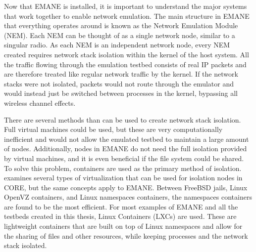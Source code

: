 Now that EMANE is installed, it is important to understand the major systems that work together to enable network emulation.
The main structure in EMANE that everything operates around is known as the Network Emulation Module (NEM).
Each NEM can be thought of as a single network node, similar to a singular radio.
As each NEM is an independent network node, every NEM created requires network stack isolation within the kernel of the host system.
All the traffic flowing through the emulation testbed consists of real IP packets and are therefore treated like regular network traffic by the kernel.
If the network stacks were not isolated, packets would not route through the emulator and would instead just be switched between processes in the kernel, bypassing all wireless channel effects. \par
There are several methods than can be used to create network stack isolation.
Full virtual machines could be used, but these are very computationally inefficient and would not allow the emulated testbed to maintain a large amount of nodes.
Additionally, nodes in EMANE do not need the full isolation provided by virtual machines, and it is even beneficial if the file system could be shared.
To solve this problem, containers are used as the primary method of isolation.
\cite{core_containers} examines several types of virtualization that can be used for isolation nodes in CORE, but the same concepts apply to EMANE.
Between FreeBSD jails, Linux OpenVZ containers, and Linux namespaces containers, the namespaces containers are found to be the most efficient.
For most examples of EMANE and all the testbeds created in this thesis, Linux Containers (LXCs) are used.
These are lightweight containers that are built on top of Linux namespaces and allow for the sharing of files and other resources, while keeping processes and the network stack isolated. \par

